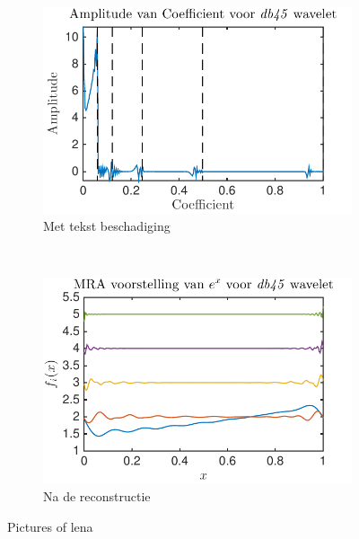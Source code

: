 \begin{figure}
\begin{subfigure}[b]{0.45\textwidth}
        \includegraphics[width=\textwidth]{../src/denoising/db45_noNoise/coef_exp_db45_4}
        \caption{Met tekst beschadiging}
        \label{fig:tiger}
    \end{subfigure}
    ~ %
    \begin{subfigure}[b]{0.45\textwidth}
        \includegraphics[width=\textwidth]{../src/denoising/db45_noNoise/MRA_exp_db45_4}
        \caption{Na de reconstructie}
        \label{fig:mouse}
    \end{subfigure}
    \caption{Pictures of lena}\label{fig:exp_noNoise}
\end{figure}






